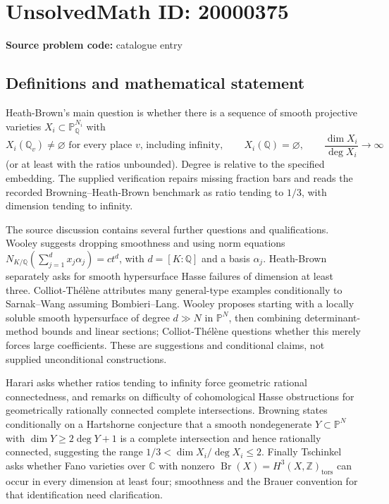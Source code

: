 \documentclass[11pt]{article}
\newcommand{\Z}{\mathbb{Z}}
\newcommand{\Q}{\mathbb{Q}}
\newcommand{\C}{\mathbb{C}}
\newcommand{\PP}{\mathbb{P}}
\begin{document}
\section*{UnsolvedMath ID: 20000375}
\textbf{Source problem code:} catalogue entry
\subsection{Definitions and mathematical statement}
Heath-Brown's main question is whether there is a sequence of smooth projective varieties $X_i\subset\PP^{N_i}_{\Q}$ with
\[
 X_i(\Q_v)\ne\varnothing\text{ for every place }v\text{, including infinity},\qquad
 X_i(\Q)=\varnothing,\qquad
 \frac{\dim X_i}{\deg X_i}\longrightarrow\infty
\]
(or at least with the ratios unbounded). Degree is relative to the specified embedding. The supplied verification repairs missing fraction bars and reads the recorded Browning--Heath-Brown benchmark as ratio tending to $1/3$, with dimension tending to infinity.

The source discussion contains several further questions and qualifications. Wooley suggests dropping smoothness and using norm equations $N_{K/\Q}(\sum_{j=1}^d x_j\alpha_j)=ct^d$, with $d=[K:\Q]$ and a basis $\alpha_j$. Heath-Brown separately asks for smooth hypersurface Hasse failures of dimension at least three. Colliot-Th\'el\`ene attributes many general-type examples conditionally to Sarnak--Wang assuming Bombieri--Lang. Wooley proposes starting with a locally soluble smooth hypersurface of degree $d\gg N$ in $\PP^N$, then combining determinant-method bounds and linear sections; Colliot-Th\'el\`ene questions whether this merely forces large coefficients. These are suggestions and conditional claims, not supplied unconditional constructions.

Harari asks whether ratios tending to infinity force geometric rational connectedness, and remarks on difficulty of cohomological Hasse obstructions for geometrically rationally connected complete intersections. Browning states conditionally on a Hartshorne conjecture that a smooth nondegenerate $Y\subset\PP^N$ with $\dim Y\geq2\deg Y+1$ is a complete intersection and hence rationally connected, suggesting the range $1/3<\dim X_i/\deg X_i\leq2$. Finally Tschinkel asks whether Fano varieties over $\C$ with nonzero $\operatorname{Br}(X)=H^3(X,\Z)_{\mathrm{tors}}$ can occur in every dimension at least four; smoothness and the Brauer convention for that identification need clarification.
\end{document}
